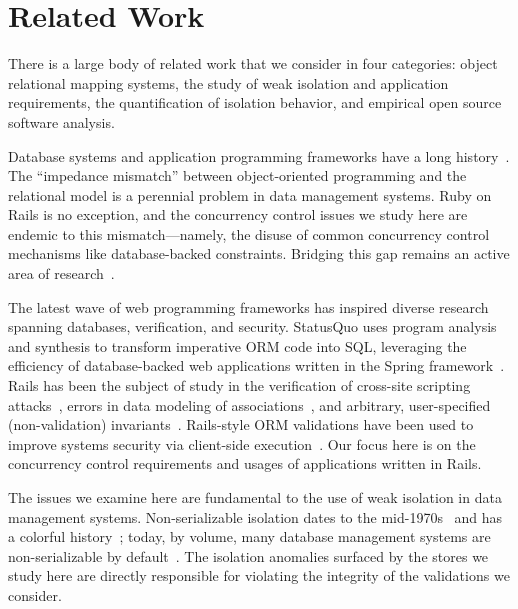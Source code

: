 

\section{Related Work}
\label{sec:relatedwork}

There is a large body of related work that we consider in four
categories: object relational mapping systems, the study of weak
isolation and application requirements, the quantification of isolation
behavior, and empirical open source software analysis.

 Database systems and application programming
frameworks have a long
history~\cite{objectstore,shore,bernstein-orm}. The ``impedance
mismatch'' between object-oriented programming and the relational
model is a perennial problem in data management systems. Ruby on Rails
is no exception, and the concurrency control issues we study here are
endemic to this mismatch---namely, the disuse of common concurrency
control mechanisms like database-backed constraints. Bridging this gap
remains an active area of research~\cite{db-to-model}.

The latest wave of web programming frameworks has inspired diverse
research spanning databases, verification, and security. StatusQuo
uses program analysis and synthesis to transform imperative ORM code
into SQL, leveraging the efficiency of database-backed web
applications written in the Spring framework~\cite{statusquo}. Rails
has been the subject of study in the verification of cross-site
scripting attacks~\cite{rails-xss}, errors in data
modeling of associations~\cite{rails-bounded}, and arbitrary,
user-specified (non-validation) invariants~\cite{invariant-web}.
Rails-style ORM validations have been used to improve systems security
via client-side execution~\cite{waves,caveat}. Our focus here is on
the concurrency control requirements and usages of applications
written in Rails.

 The issues we examine here
are fundamental to the use of weak isolation in data management
systems. Non-serializable isolation dates to the
mid-1970s~\cite{gray-isolation} and has a colorful
history~\cite{adya-isolation}; today, by volume, many database
management systems are non-serializable by
default~\cite{hat-vldb}. The isolation anomalies surfaced by
the stores we study here are directly responsible for violating the
integrity of the validations we consider.

